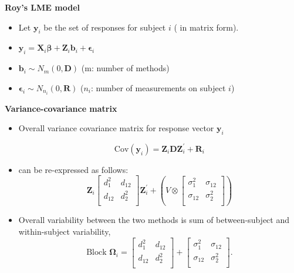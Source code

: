 \documentclass[compress]{beamer}        %
\makeatletter
\newcommand{\tcb}{\textcolor{beamer@blendedblue}}
\makeatother
\begin{document}
\begin{frame}{\bf \tcb{Roy's LME model}}
\begin{itemize}\itemsep0.7cm

\item Let $\boldsymbol{y}_i$ be the set of responses for subject $i$ ( in matrix form).
\item $\boldsymbol{y}_i = \boldsymbol{X}_i\boldsymbol{\beta} + \boldsymbol{Z}_i \boldsymbol{b}_i + \boldsymbol{\epsilon}_i$
\item $\boldsymbol{b}_i \sim N_m(0,\boldsymbol{D})$  (m: number of methods)
\item $\boldsymbol{\epsilon}_i \sim N_{n_i}(0,\boldsymbol{R})$ ($n_i$: number of measurements on subject $i$)
\end{itemize}
\end{frame}



\begin{frame}{\bf \tcb{Variance-covariance matrix}}
\begin{itemize}
\item Overall variance covariance matrix for response vector $\boldsymbol{y}_i$

\[ \mbox{Cov}(\boldsymbol{y}_i)= \boldsymbol{Z}_i \boldsymbol{D}\boldsymbol{Z}^{\prime}_i + \boldsymbol{R}_i \]

\item can be re-expressed as follows:
\[\boldsymbol{Z}_i \left[ \begin{array}{cc} d^2_1 & d_{12}\\
d_{12} & d^2_2\\ \end{array}\right]\boldsymbol{Z}^{\prime}_i  +  \left(V \otimes \left[\begin{array}{cc} \sigma^2_1 & \sigma_{12}\\
\sigma_{12} & \sigma^2_2\\ \end{array}\right] \right)
\]

\item Overall variability between the two methods is sum of between-subject and within-subject variability,
\[
 \mbox{Block } \boldsymbol{\Omega}_i = \left[ \begin{array}{cc} d^2_1 & d_{12}\\ d_{12} & d^2_2\\ \end{array} \right]
+ \left[\begin{array}{cc} \sigma^2_1 & \sigma_{12}\\ \sigma_{12} & \sigma^2_2\\ \end{array}\right].
\]

\end{itemize}
\end{frame}
\end{document}
